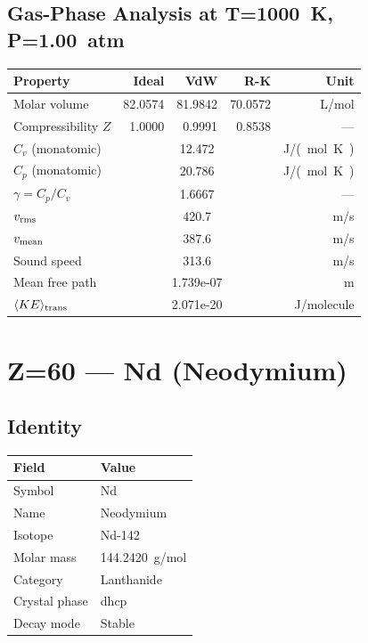 \documentclass[11pt,a4paper]{article}
\begin{document}
\subsection{Gas-Phase Analysis at T=\SI{1000}{K}, P=\SI{1.00}{atm}}
\begin{tabular}{lrrrr}
  \toprule
  Property & Ideal & VdW & R-K & Unit \\
  \midrule
  Molar volume & 82.0574 & 81.9842 & 70.0572 & \si{L/mol} \\
  Compressibility $Z$ & 1.0000 & 0.9991 & 0.8538 & --- \\
  \midrule
  $C_v$ (monatomic) & \multicolumn{3}{c}{12.472} & \si{J/(mol.K)} \\
  $C_p$ (monatomic) & \multicolumn{3}{c}{20.786} & \si{J/(mol.K)} \\
  $\gamma = C_p/C_v$ & \multicolumn{3}{c}{1.6667} & --- \\
  $v_{\rm rms}$ & \multicolumn{3}{c}{420.7} & \si{m/s} \\
  $v_{\rm mean}$ & \multicolumn{3}{c}{387.6} & \si{m/s} \\
  Sound speed & \multicolumn{3}{c}{313.6} & \si{m/s} \\
  Mean free path & \multicolumn{3}{c}{1.739e-07} & \si{m} \\
  $\langle KE \rangle_{\rm trans}$ & \multicolumn{3}{c}{2.071e-20} & \si{J/molecule} \\
  \bottomrule
\end{tabular}

\newpage

\section{Z=60 --- Nd (Neodymium)}
\label{sec:Z60}

\subsection{Identity}
\begin{tabular}{ll}
  \toprule
  Field & Value \\
  \midrule
  Symbol & Nd \\
  Name & Neodymium \\
  Isotope & Nd-142 \\
  Molar mass & \SI{144.2420}{g/mol} \\
  Category & Lanthanide \\
  Crystal phase & dhcp \\
  Decay mode & Stable \\
  \bottomrule
\end{tabular}
\end{document}
